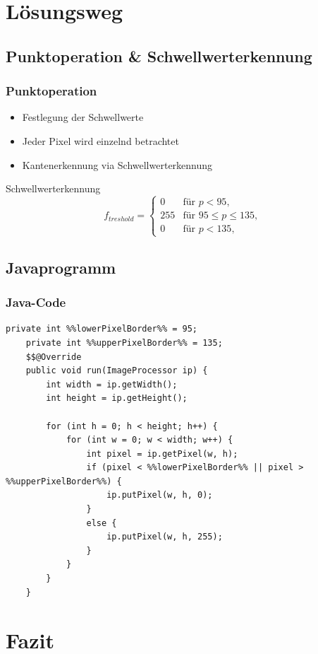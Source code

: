 \documentclass[12pt]{beamer}
\begin{document}
\section{Lösungsweg}
\subsection{Punktoperation \& Schwellwerterkennung}
\begin{frame}
\frametitle{Punktoperation}
\begin{itemize}
	\item Festlegung der Schwellwerte
	\item Jeder Pixel wird einzelnd betrachtet
	\item Kantenerkennung via Schwellwerterkennung
\end{itemize}

\pause

\begin{block}{Schwellwerterkennung}	
	\begin{equation*}
		f_{treshold}=
		\begin{cases}
			0   			& \text{für } p < 95,\\
			255        		& \text{für } 95 \leq p \leq 135, \\
			0        		& \text{für } p < 135,
		\end{cases}
	\end{equation*}
\end{block}
\end{frame}
\subsection{Javaprogramm}
\begin{frame}[fragile]
	\frametitle{Java-Code}
	\begin{lstlisting}[basicstyle=\scriptsize]
	private int %%lowerPixelBorder%% = 95;
	private int %%upperPixelBorder%% = 135;	
	$$@Override
	public void run(ImageProcessor ip) {
		int width = ip.getWidth();
		int height = ip.getHeight();
		
		for (int h = 0; h < height; h++) {
			for (int w = 0; w < width; w++) {
				int pixel = ip.getPixel(w, h);
				if (pixel < %%lowerPixelBorder%% || pixel > %%upperPixelBorder%%) {
					ip.putPixel(w, h, 0);
				}
				else {
					ip.putPixel(w, h, 255);
				}
			}
		}	
	}
	\end{lstlisting}
\end{frame}

\section{Fazit}
\end{document}
